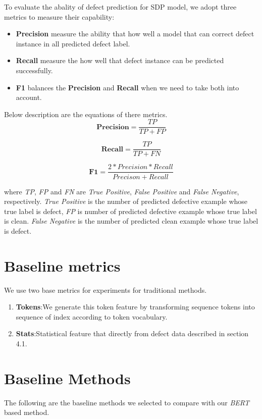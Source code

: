 To evaluate the abality of defect prediction for SDP model, we adopt three metrics to measure their capability:
\begin{itemize}
    \item \textbf{Precision} measure the ability that how well a model that can correct defect instance in all predicted defect label.
    \item \textbf{Recall} measure the how well that defect instance can be predicted successfully.
    \item \textbf{F1} balances the \textbf{Precision} and \textbf{Recall} when we need to take both into account.
\end{itemize}
Below description are the equations of there metrics.
\begin{equation}
    \textbf{Precision}=\frac{TP}{TP+FP}
\end{equation}

\begin{equation}
    \textbf{Recall}=\frac{TP}{TP+FN}
\end{equation}

\begin{equation}
    \textbf{F1}=\frac{2*Precision*Recall}{Precison+Recall}
\end{equation}

where \textit{TP}, \textit{FP} and \textit{FN} are  \textit{True Positive}, \textit{False Positive} and \textit{False Negative}, respectively. \textit{True Positive} is the number of predicted defective example whose true label is defect, \textit{FP} is number of predicted defective example whose true label is clean. \textit{False Negative} is the number of predicted clean example whose true label is defect.

\section{Baseline metrics}
We use two base metrics for experiments for traditional methods. 
\begin{enumerate}
    \item \textbf{Tokens}:We generate this token feature by transforming sequence tokens into sequence of index according to token vocabulary.
    \item \textbf{Stats}:Statistical feature that directly from defect data described in section 4.1.
\end{enumerate}

\section{Baseline Methods}
The following are the baseline methods we selected to compare with our \textit{BERT} based method.


